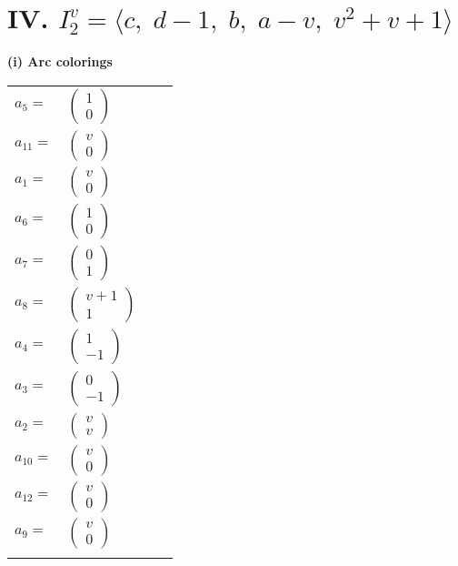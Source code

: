 \documentclass[1p]{elsarticle_modified}
\theoremstyle{definition}
\begin{document}
\centering \section*{IV. $I^v_{2}= \langle c,\;d-1,\;b,\;a- v,\;v^2+v+1 \rangle$}
\flushleft \textbf{(i) Arc colorings}\\
\begin{tabular}{m{7pt} m{180pt} m{7pt} m{180pt} }
\flushright $a_{5}=$&$\begin{pmatrix}1\\0\end{pmatrix}$ \\
\flushright $a_{11}=$&$\begin{pmatrix}v\\0\end{pmatrix}$ \\
\flushright $a_{1}=$&$\begin{pmatrix}v\\0\end{pmatrix}$ \\
\flushright $a_{6}=$&$\begin{pmatrix}1\\0\end{pmatrix}$ \\
\flushright $a_{7}=$&$\begin{pmatrix}0\\1\end{pmatrix}$ \\
\flushright $a_{8}=$&$\begin{pmatrix}v+1\\1\end{pmatrix}$ \\
\flushright $a_{4}=$&$\begin{pmatrix}1\\-1\end{pmatrix}$ \\
\flushright $a_{3}=$&$\begin{pmatrix}0\\-1\end{pmatrix}$ \\
\flushright $a_{2}=$&$\begin{pmatrix}v\\v\end{pmatrix}$ \\
\flushright $a_{10}=$&$\begin{pmatrix}v\\0\end{pmatrix}$ \\
\flushright $a_{12}=$&$\begin{pmatrix}v\\0\end{pmatrix}$ \\
\flushright $a_{9}=$&$\begin{pmatrix}v\\0\end{pmatrix}$\\&\end{tabular}
\end{document}
